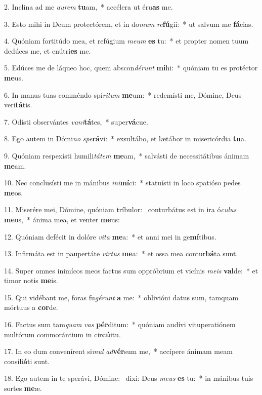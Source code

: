 2. Inclína ad me \textit{au}\textit{rem} \textbf{tu}am,~*  accélera ut éru\textbf{as} me.\

3. Esto mihi in Deum protectórem, et in do\textit{mum} \textit{re}\textbf{fú}gii:~*  ut salvum me \textbf{fá}cias.\

4. Quóniam fortitúdo mea, et refúgium \textit{me}\textit{um} \textbf{es} tu:~*  et propter nomen tuum dedúces me, et enútri\textbf{es} me.\

5. Edúces me de láqueo hoc, quem abscon\textit{dé}\textit{runt} \textbf{mi}hi:~*  quóniam tu es protéctor \textbf{me}us.\

6. In manus tuas comméndo spí\textit{ri}\textit{tum} \textbf{me}um:~*  redemísti me, Dómine, Deus veri\textbf{tá}tis.\

7. Odísti observántes \textit{va}\textit{ni}\textbf{tá}tes,~*  super\textbf{vá}cue.\

8. Ego autem in Dómi\textit{no} \textit{spe}\textbf{rá}vi:~*  exsultábo, et lætábor in misericórdia \textbf{tu}a.\

9. Quóniam respexísti humili\textit{tá}\textit{tem} \textbf{me}am,~*  salvásti de necessitátibus ánimam \textbf{me}am.\

10. Nec conclusísti me in mánibus \textit{in}\textit{i}\textbf{mí}ci:~*  statuísti in loco spatióso pedes \textbf{me}os.\

11. Miserére mei, Dómine, quóniam tríbulor: \dag\  conturbátus est in ira ó\textit{cu}\textit{lus} \textbf{me}us,~*  ánima mea, et venter \textbf{me}us:\

12. Quóniam defécit in dolóre \textit{vi}\textit{ta} \textbf{me}a:~*  et anni mei in ge\textbf{mí}tibus.\

13. Infirmáta est in paupertáte \textit{vir}\textit{tus} \textbf{me}a:~*  et ossa mea contur\textbf{bá}ta sunt.\

14. Super omnes inimícos meos factus sum oppróbrium et vicínis \textit{me}\textit{is} \textbf{val}de:~*  et timor notis \textbf{me}is.\

15. Qui vidébant me, foras fu\textit{gé}\textit{runt} \textbf{a} me:~*  oblivióni datus sum, tamquam mórtuus a \textbf{cor}de.\

16. Factus sum tam\textit{quam} \textit{vas} \textbf{pér}ditum:~*  quóniam audívi vituperatiónem multórum commorántium in cir\textbf{cú}itu.\

17. In eo dum convenírent si\textit{mul} \textit{ad}\textbf{vér}sum me,~*  accípere ánimam meam consili\textbf{á}ti sunt.\

18. Ego autem in te sperávi, Dómine: \dag\  dixi: Deus \textit{me}\textit{us} \textbf{es} tu:~*  in mánibus tuis sortes \textbf{me}æ.\

